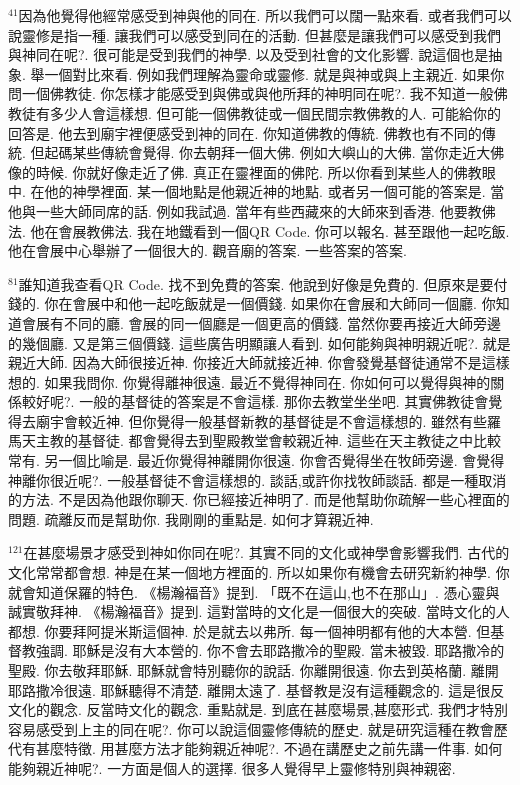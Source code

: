 \documentclass{book}
\begin{document}
$^{41}$因為他覺得他經常感受到神與他的同在.
所以我們可以闊一點來看.
或者我們可以說靈修是指一種.
讓我們可以感受到同在的活動.
但甚麼是讓我們可以感受到我們與神同在呢?.
很可能是受到我們的神學.
以及受到社會的文化影響.
說這個也是抽象.
舉一個對比來看.
例如我們理解為靈命或靈修.
就是與神或與上主親近.
如果你問一個佛教徒.
你怎樣才能感受到與佛或與他所拜的神明同在呢?.
我不知道一般佛教徒有多少人會這樣想.
但可能一個佛教徒或一個民間宗教佛教的人.
可能給你的回答是.
他去到廟宇裡便感受到神的同在.
你知道佛教的傳統.
佛教也有不同的傳統.
但起碼某些傳統會覺得.
你去朝拜一個大佛.
例如大嶼山的大佛.
當你走近大佛像的時候.
你就好像走近了佛.
真正在靈裡面的佛陀.
所以你看到某些人的佛教眼中.
在他的神學裡面.
某一個地點是他親近神的地點.
或者另一個可能的答案是.
當他與一些大師同席的話.
例如我試過.
當年有些西藏來的大師來到香港.
他要教佛法.
他在會展教佛法.
我在地鐵看到一個QR Code.
你可以報名.
甚至跟他一起吃飯.
他在會展中心舉辦了一個很大的.
觀音廟的答案.
一些答案的答案.

$^{81}$誰知道我查看QR Code.
找不到免費的答案.
他說到好像是免費的.
但原來是要付錢的.
你在會展中和他一起吃飯就是一個價錢.
如果你在會展和大師同一個廳.
你知道會展有不同的廳.
會展的同一個廳是一個更高的價錢.
當然你要再接近大師旁邊的幾個廳.
又是第三個價錢.
這些廣告明顯讓人看到.
如何能夠與神明親近呢?.
就是親近大師.
因為大師很接近神.
你接近大師就接近神.
你會發覺基督徒通常不是這樣想的.
如果我問你.
你覺得離神很遠.
最近不覺得神同在.
你如何可以覺得與神的關係較好呢?.
一般的基督徒的答案是不會這樣.
那你去教堂坐坐吧.
其實佛教徒會覺得去廟宇會較近神.
但你覺得一般基督新教的基督徒是不會這樣想的.
雖然有些羅馬天主教的基督徒.
都會覺得去到聖殿教堂會較親近神.
這些在天主教徒之中比較常有.
另一個比喻是.
最近你覺得神離開你很遠.
你會否覺得坐在牧師旁邊.
會覺得神離你很近呢?.
一般基督徒不會這樣想的.
談話,或許你找牧師談話.
都是一種取消的方法.
不是因為他跟你聊天.
你已經接近神明了.
而是他幫助你疏解一些心裡面的問題.
疏離反而是幫助你.
我剛剛的重點是.
如何才算親近神.

$^{121}$在甚麼場景才感受到神如你同在呢?.
其實不同的文化或神學會影響我們.
古代的文化常常都會想.
神是在某一個地方裡面的.
所以如果你有機會去研究新約神學.
你就會知道保羅的特色.
《楊瀚福音》提到.
「既不在這山,也不在那山」.
憑心靈與誠實敬拜神.
《楊瀚福音》提到.
這對當時的文化是一個很大的突破.
當時文化的人都想.
你要拜阿提米斯這個神.
於是就去以弗所.
每一個神明都有他的大本營.
但基督教強調.
耶穌是沒有大本營的.
你不會去耶路撒冷的聖殿.
當未被毀.
耶路撒冷的聖殿.
你去敬拜耶穌.
耶穌就會特別聽你的說話.
你離開很遠.
你去到英格蘭.
離開耶路撒冷很遠.
耶穌聽得不清楚.
離開太遠了.
基督教是沒有這種觀念的.
這是很反文化的觀念.
反當時文化的觀念.
重點就是.
到底在甚麼場景,甚麼形式.
我們才特別容易感受到上主的同在呢?.
你可以說這個靈修傳統的歷史.
就是研究這種在教會歷代有甚麼特徵.
用甚麼方法才能夠親近神呢?.
不過在講歷史之前先講一件事.
如何能夠親近神呢?.
一方面是個人的選擇.
很多人覺得早上靈修特別與神親密.
\end{document}
